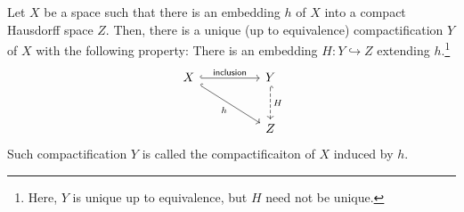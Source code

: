 \begin{lem}\label{emb&cptf}
    Let $X$ be a space such that there is an embedding $h$ of $X$ into a compact Hausdorff space $Z$.
    Then, there is a unique (up to equivalence) compactification $Y$ of $X$ with the following property:
    There is an embedding $H: Y\hookrightarrow Z$ extending $h$.\footnote{Here, $Y$ is unique up to equivalence, but $H$ need not be unique.}
    \begin{equation*}
        \begin{tikzcd}[row sep=large, column sep=huge]
            X \arrow[dr, "h"', hook] \arrow[r, "\textsf{inclusion}", hook] & Y \arrow[d, "H", hook, dashed] \\
            &Z
        \end{tikzcd}
    \end{equation*}
    Such compactification $Y$ is called the compactificaiton of $X$ induced by $h$.
\end{lem}
